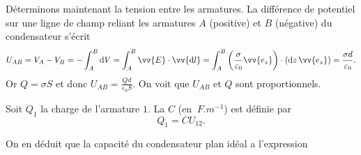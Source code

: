 \documentclass[12pt,fancy]{cours}
\begin{document}
 Déterminons maintenant la tension entre les armatures.
La différence de potentiel sur une ligne de champ reliant les armatures $A$ (positive) et $B$ (négative) du condensateur s'écrit
\begin{equation}
U_{AB}=V_{A}-V_{B}=-\int_{A}^{B}\d V=\int_{A}^{B}\vv{E}\cdot\vv{\d l}=\int_{A}^{B}\left(\frac{\sigma}{\varepsilon_0}\vv{e_z}\right)\cdot \left(\d z\,\vv{e_z}\right)=\frac{\sigma d}{\varepsilon_0}.
\end{equation}
Or $Q=\sigma S$ et donc $U_{AB}=\frac{Qd}{\varepsilon_0 S}$. On voit que $U_{AB}$ et $Q$ sont proportionnels.
\begin{definition}\label{def:}
  
  Soit $Q_1$ la charge de l’armature $1$. La  $C$ (en $\SI{}{F.m^{-1}}$) est définie par
  \begin{equation*}
    Q_1=C U_{12}.
  \end{equation*}
\end{definition}
 On en déduit que la capacité du condensateur plan idéal a l'expression 

\end{document}
